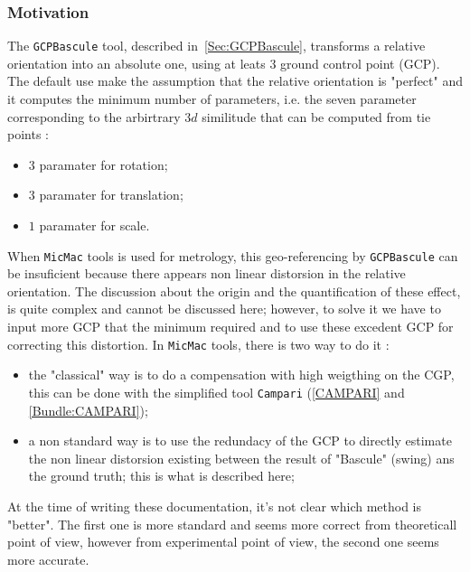 \subsubsection{Motivation}

\label{NonLin:GCPBascule}

The {\tt GCPBascule} tool, described in~\ref{Sec:GCPBascule}, transforms a relative orientation
into an absolute one, using at leats $3$ ground control point (GCP). The default use make
the assumption that the relative orientation is "perfect" and it computes the minimum number
of parameters, i.e. the seven parameter corresponding to the arbirtrary $3d$ similitude
 that can be computed from tie points : 

\begin{itemize}
   \item $3$ paramater for rotation; 
   \item $3$ paramater for translation; 
   \item $1$ paramater for scale.
\end{itemize}


When {\tt MicMac} tools is used for metrology, this geo-referencing by {\tt GCPBascule}
can be insuficient because there appears non linear distorsion in the relative orientation. The discussion about the
origin and the quantification of these effect,  is quite complex and cannot be discussed here;
however,  to solve it we have to input more GCP that the minimum required and to use these
excedent GCP for correcting this distortion. In {\tt MicMac} tools, there is two way to do it :


\begin{itemize}
   \item the "classical" way is to do a compensation with high weigthing on the CGP, this can be done
        with the simplified tool   {\tt Campari}  (\ref{CAMPARI} and \ref{Bundle:CAMPARI});

   \item a non standard way is to use the redundacy of the GCP to directly estimate the non linear distorsion  
        existing between the result of "Bascule" (swing) ans the ground truth; this is what is described here;

\end{itemize}

At the time of writing these documentation, it's not clear which method is "better". The first one is more
standard and seems more correct from theoreticall point of view, however from experimental point of view, the 
second one seems more accurate.


